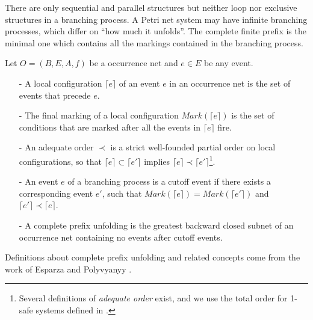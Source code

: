 \documentclass{llncs}
\begin{document}
There are only sequential and parallel structures but neither loop nor exclusive structures in a branching process. A Petri net system may have infinite branching processes, which differ on ``how much it unfolds''. The complete finite prefix is the minimal one which contains all the markings contained in the branching process.

\begin{definition}\label{def:cpu}
Let $O=(B,E,A,f)$ be a occurrence net and $e\in E$ be any event.
	\begin{itemize}
		\item[-] A local configuration $\lceil e\rceil$ of an event $e$ in an occurrence net is the set of events that precede $e$.
		\item[-] The final marking of a local configuration $Mark(\lceil e\rceil)$ is the set of conditions that are marked after all the events in $\lceil e\rceil$ fire.
		\item[-] An adequate order $\prec$ is a strict well-founded partial order on local configurations, so that $\lceil e\rceil\subset\lceil e'\rceil$ implies $\lceil e\rceil\prec\lceil e'\rceil$\footnote{Several definitions of \textit{adequate order} exist, and we use the total order for 1-safe systems defined in \cite{esparza1996improvement}.}.
		\item[-] An event $e$ of a branching process is a cutoff event if there exists a corresponding event $e'$, such that $Mark(\lceil e\rceil)=Mark(\lceil e'\rceil)$ and $\lceil e'\rceil\prec\lceil e\rceil$.
		\item[-] A complete prefix unfolding is the greatest backward closed subnet of an occurrence net containing no events after cutoff events.
	\end{itemize}
\end{definition}

Definitions about complete prefix unfolding and related concepts come from the work of Esparza \cite{esparza1996improvement} and Polyvyanyy \cite{polyvyanyy2010structuring}.
\end{document}
